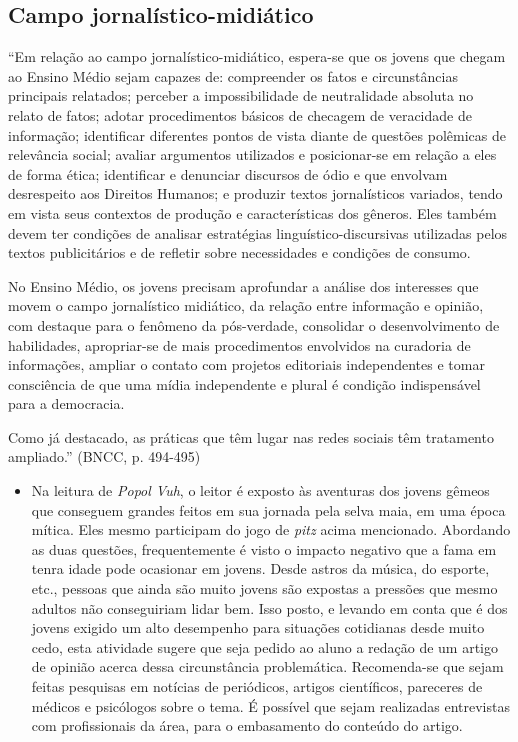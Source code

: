 \documentclass[12pt]{extarticle}
\begin{document}
\subsection{Campo jornalístico-midiático}

``Em relação ao campo jornalístico-midiático, espera-se que os jovens
que chegam ao Ensino Médio sejam capazes de: compreender os fatos e
circunstâncias principais relatados; perceber a impossibilidade de
neutralidade absoluta no relato de fatos; adotar procedimentos básicos
de checagem de veracidade de informação; identificar diferentes pontos
de vista diante de questões polêmicas de relevância social; avaliar
argumentos utilizados e posicionar-se em relação a eles de forma ética;
identificar e denunciar discursos de ódio e que envolvam desrespeito aos
Direitos Humanos; e produzir textos jornalísticos variados, tendo em
vista seus contextos de produção e características dos gêneros. Eles
também devem ter condições de analisar estratégias
linguístico-discursivas utilizadas pelos textos publicitários e de
refletir sobre necessidades e condições de consumo.

No Ensino Médio, os jovens precisam aprofundar a análise dos interesses
que movem o campo jornalístico midiático, da relação entre informação e
opinião, com destaque para o fenômeno da pós-verdade, consolidar o
desenvolvimento de habilidades, apropriar-se de mais procedimentos
envolvidos na curadoria de informações, ampliar o contato com projetos
editoriais independentes e tomar consciência de que uma mídia
independente e plural é condição indispensável para a democracia.

Como já destacado, as práticas que têm lugar nas redes sociais têm
tratamento ampliado.'' (BNCC, p. 494-495)

\begin{itemize}
\item
  Na leitura de \emph{Popol Vuh}, o leitor é exposto às aventuras dos
  jovens gêmeos que conseguem grandes feitos em sua jornada pela selva
  maia, em uma época mítica. Eles mesmo participam do jogo de
  \emph{pitz} acima mencionado. Abordando as duas questões,
  frequentemente é visto o impacto negativo que a fama em tenra idade
  pode ocasionar em jovens. Desde astros da música, do esporte, etc.,
  pessoas que ainda são muito jovens são expostas a pressões que mesmo
  adultos não conseguiriam lidar bem. Isso posto, e levando em conta que
  é dos jovens exigido um alto desempenho para situações cotidianas
  desde muito cedo, esta atividade sugere que seja pedido ao aluno a
  redação de um artigo de opinião acerca dessa circunstância
  problemática. Recomenda-se que sejam feitas pesquisas em notícias de
  periódicos, artigos científicos, pareceres de médicos e psicólogos
  sobre o tema. É possível que sejam realizadas entrevistas com
  profissionais da área, para o embasamento do conteúdo do artigo.
\end{itemize}
\end{document}
